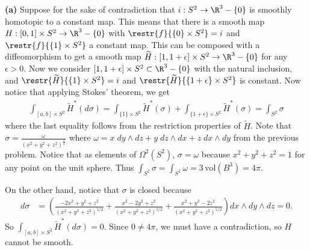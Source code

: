 \documentclass[11pt,letterpaper]{article}
\begin{document}
\begin{solution}
    \textbf{(a)} Suppose for the sake of contradiction that $i : S^2 \to \R^3-\{0\}$ is smoothly homotopic to a constant map. This means that there is a smooth map $H : [0,1]\times S^2 \to \R^3-\{0\}$ with $\restr{f}{\{0\}\times S^2} = i$ and $\restr{f}{\{1\}\times S^2}$ a constant map. This can be composed with a diffeomorphism to get a smooth map $\widetilde{H} : [1,1+\epsilon]\times S^2 \to \R^3-\{0\}$ for any $\epsilon > 0$. Now we consider $[1,1+\epsilon]\times S^2\subset \R^3-\{0\}$ with the natural inclusion, and $\restr{\widetilde{H}}{\{1\}\times S^2} = i$ and $\restr{\widetilde{H}}{\{1+\epsilon\}\times S^2}$ is constant. Now notice that applying Stokes' theorem, we get
    \[
        \begin{aligned}
            \int_{[a,b]\times S^2} \widetilde{H}^*(d\sigma) = \int_{\{1\}\times S^2}\widetilde{H}^*(\sigma)+\int_{\{1+\epsilon\}\times S^2} \widetilde{H}^*(\sigma) = \int_{S^2} \sigma
        \end{aligned}
    \] 
    where the last equality follows from the restriction properties of $\widetilde{H}$. Note that $\sigma=\frac{\omega}{(x^2+y^2+z^2)^{\frac{3}{2}}}$ where $\omega=x\;dy\wedge dz+y\;dz\wedge dx+z\;dx\wedge dy$ from the previous problem. Notice that as elements of $\Omega^2(S^2)$, $\sigma=\omega$ because $x^2+y^2+z^2=1$ for any point on the unit sphere. Thus $\int_{S^2} \sigma = \int_{S^2}\omega=3\,\textrm{vol}(B^3)=4\pi$. 

    On the other hand, notice that $\sigma$ is closed because
    \[
        \begin{aligned}
            d\sigma &= \left(\frac{-2x^2+y^2+z^2}{(x^2+y^2+z^2)^{5 /2}} + \frac{x^2-2y^2+z^2}{(x^2+y^2+z^2)^{5 /2}}+\frac{x^2+y^2-2z^2}{(x^2+y^2+z^2)^{5 /2}}\right) dx\wedge dy\wedge dz = 0.
        \end{aligned}
    \]
    So $\int_{[a,b]\times S^2}\widetilde{H}^*(d\sigma)=0$. Since $0\neq 4\pi$, we must have a contradiction, so $H$ cannot be smooth.  
    

\end{solution}
\end{document}
